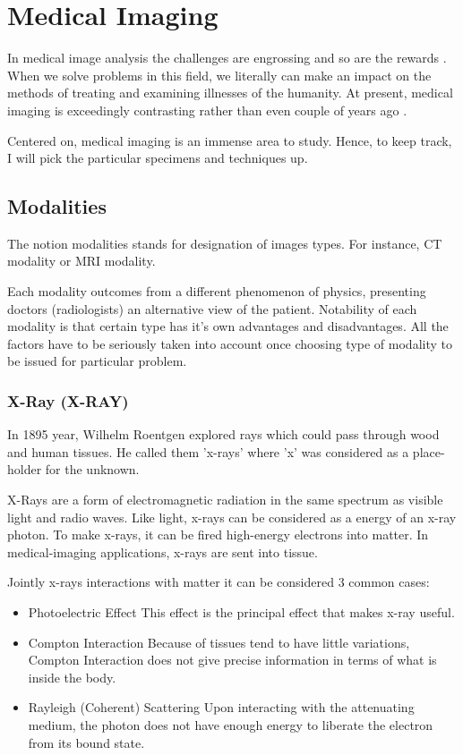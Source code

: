 \chapter{Medical Imaging}
\label{ch:rworks}

In medical image analysis the challenges are engrossing and so are the rewards \cite{Duncan2000}. When we solve problems in this field, we literally can make an impact on the methods of treating and examining illnesses of the humanity. At present, medical imaging is exceedingly contrasting rather than even couple of years ago \cite{Wang2020}. 

Centered on, medical imaging is an immense area to study. Hence, to keep track, I will pick the particular specimens and techniques up.

\section{Modalities}
The notion modalities \cite{Seeram2004} stands for designation of images types. For instance, CT modality or MRI modality. 

Each modality outcomes from a different phenomenon of physics, presenting doctors (radiologists) an alternative view of the patient. Notability of each modality is that certain type has it's own advantages and disadvantages. All the factors have to be seriously taken into account once choosing type of modality to be issued for particular problem.

\subsection{X-Ray (X-RAY)}
In 1895 year, Wilhelm Roentgen explored rays which could pass through wood and human tissues. He called them \cite{Barker1996} 'x-rays' where 'x' was considered as a place-holder for the unknown.

X-Rays are a form of electromagnetic radiation in the same spectrum as visible light and radio waves. Like light, x-rays can be considered as a energy of an x-ray photon. To make x-rays, it can be fired high-energy electrons into matter. In medical-imaging applications, x-rays are sent into tissue. 

Jointly x-rays interactions with matter it can be considered 3 common cases:
\begin{itemize}
    \item Photoelectric Effect
    \newline This effect is the principal effect that makes x-ray useful.
    \item Compton Interaction
    \newline Because of tissues tend to have little variations, Compton Interaction does not give precise information in terms of what is inside the body. 
    \item Rayleigh (Coherent) Scattering
    \newline Upon interacting with the attenuating medium, the photon does not have enough energy to liberate the electron from its bound state.
\end{itemize}

